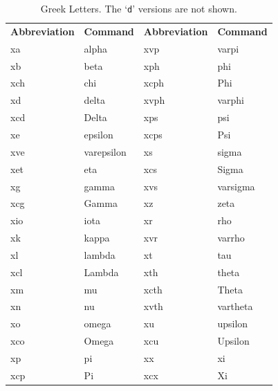 \documentclass[letterpaper,11pt]{article}
\newcommand{\TS}{\textsf{\TeX Shop}}
\begin{document}
\begin{table}[H]
\small\centering
\begin{tabular}{llll}
\textbf{Abbreviation} & \textbf{Command} & \textbf{Abbreviation} & \textbf{Command} \\
\cmidrule[0.5pt](lr){1-1} \cmidrule[0.5pt](lr){2-2} \cmidrule[0.5pt](lr){3-3} \cmidrule[0.5pt](lr){4-4}
xa  & alpha      & xvp  & varpi \\
xb  & beta       & xph  & phi \\
xch & chi        & xcph & Phi \\
xd  & delta      & xvph & varphi \\
xcd & Delta      & xps  & psi \\
xe  & epsilon    & xcps & Psi \\
xve & varepsilon & xs   & sigma \\
xet & eta        & xcs  & Sigma \\
xg  & gamma      & xvs  & varsigma \\
xcg & Gamma      & xz   & zeta \\
xio & iota       & xr   & rho \\
xk  & kappa      & xvr  & varrho \\
xl  & lambda     & xt   & tau \\
xcl & Lambda     & xth  & theta \\
xm  & mu         & xcth & Theta \\
xn  & nu         & xvth & vartheta \\
xo  & omega      & xu   & upsilon \\
xco & Omega      & xcu  & Upsilon \\
xp  & pi         & xx   & xi \\
xcp & Pi         & xcx  & Xi \\
\end{tabular}
\caption{Greek Letters. The `\texttt{d}' versions are not shown.}
\label{tbl:greek}
\end{table}

%
%
\end{document}
